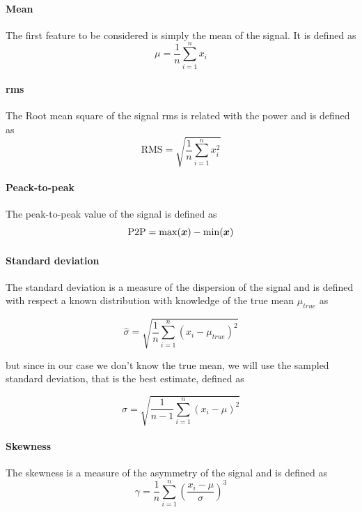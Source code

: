 \paragraph{Mean}
The first feature to be considered is simply the mean of the signal. It is defined as
\begin{equation}
    \mu = \frac{1}{n}\sum_{i=1}^n x_i
\end{equation}

\paragraph{\gls{rms}}
The Root mean square of the signal \gls{rms} is related with the power and is defined as
\begin{equation}
    \text{RMS} = \sqrt{\frac{1}{n}\sum_{i=1}^n x_i^2}
\end{equation}

\paragraph{Peack-to-peak}
The peak-to-peak value of the signal is defined as
\begin{equation}
    \text{P2P} = \max(\bm{x}) - \min(\bm{x})
\end{equation}

\paragraph{Standard deviation}
The standard deviation is a measure of the dispersion of the signal and is defined with respect a known distribution with knowledge of the true mean $\mu_{true}$ as

\begin{equation}
    \hat{\sigma} = \sqrt{\frac{1}{n}\sum_{i=1}^n (x_i - \mu_{true})^2}
\end{equation}

but since in our case we don't know the true mean, we will use the sampled standard deviation, that is the best estimate, defined as

\begin{equation}
    \sigma = \sqrt{\frac{1}{n-1}\sum_{i=1}^n (x_i - \mu)^2}
\end{equation}

\paragraph{Skewness}
The skewness is a measure of the asymmetry of the signal and is defined as
\begin{equation}
    \gamma = \frac{1}{n}\sum_{i=1}^n \left(\frac{x_i - \mu}{\sigma}\right)^3
\end{equation}

